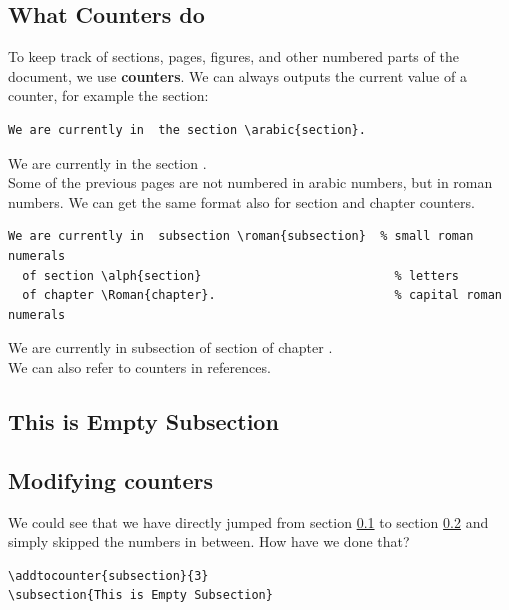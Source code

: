 \documentclass[a4paper,10pt]{report} %
\begin{document}
\subsection{What Counters do}\label{sec:counters}
To keep track of sections, pages, figures, and other numbered parts of the document, we use \textbf{counters}. We can always outputs the current value of a counter, for example the section:
\begin{lstlisting}[language={[latex]tex}, 
  frame=single,
  basicstyle=\footnotesize\color{darkgray}, 
  keywordstyle=\bf\color{magenta},
  commentstyle=\color{ForestGreen},  %
  breaklines=true
  ]
  We are currently in  the section \arabic{section}.
\end{lstlisting}

We are currently in  the section .\\

Some of the previous pages are not numbered in arabic numbers, but in roman numbers. We can get the same format also for section and chapter counters. 

\begin{lstlisting}[language={[latex]tex}, 
  frame=single,
  basicstyle=\footnotesize\color{darkgray}, 
  keywordstyle=\bf\color{magenta},
  commentstyle=\color{ForestGreen},  %
  breaklines=true
  ]
  We are currently in  subsection \roman{subsection}  % small roman numerals 
  of section \alph{section}                           % letters
  of chapter \Roman{chapter}.                         % capital roman numerals
\end{lstlisting}
 We are currently in  subsection   %
  of section                            %
  of chapter . \\                      %

  We can also refer to counters in references.
  
  

\addtocounter{subsection}{3}
\subsection{This is Empty Subsection}\label{sec:empty}

\subsection{Modifying counters}

We could see that we have directly jumped from section \ref{sec:counters} to section \ref{sec:empty} and simply skipped the numbers in between.
How have we done that?
\begin{lstlisting}[language={[latex]tex},
  frame=single,
  basicstyle=\footnotesize\color{darkgray}, 
  keywordstyle=\bf\color{magenta},
  commentstyle=\color{ForestGreen},  %
  breaklines=true
  ]
\addtocounter{subsection}{3}
\subsection{This is Empty Subsection}  
\end{lstlisting}
\end{document}
